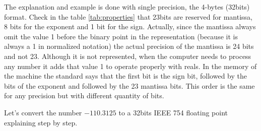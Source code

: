 \FloatBarrier
The explanation and example is done with single precision, the 4-bytes (32bits) format. Check in the table \ref{tab:properties} that 23bits are reserved for mantissa, 8 bits for the exponent and 1 bit for the sign. Actually, since the mantissa always omit the value 1 before the binary point in the representation (because it is always a 1 in normalized notation) the actual precision of the mantissa is 24 bits and not 23. Although it is not represented, when the computer needs to process any number it adds that value 1 to operate properly with reals. In the memory of the machine the standard says that the first bit is the sign bit, followed by the bits of the exponent and followed by the 23 mantissa bits. This order is the same for any precision but with different quantity of bits. 

Let's convert the number $-110.3125$ to a 32bits IEEE 754 floating point explaining step by step.

